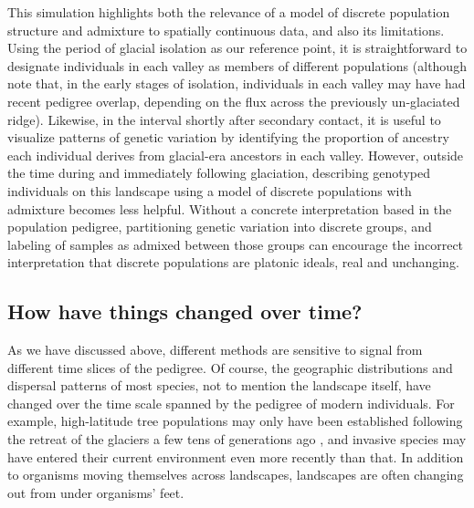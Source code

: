 \documentclass{ar-1col}
\newcommand{\g}[1]{{\color{blue}{#1}}}
\begin{document}
This simulation highlights both the relevance of 
a model of discrete population structure and admixture
to spatially continuous data, 
and also its limitations.
Using the period of glacial isolation as our reference point, 
it is straightforward to designate individuals in each valley 
as members of different populations 
(although note that, in the early stages of isolation, 
individuals in each valley may have had recent pedigree overlap, 
depending on the flux across the previously un-glaciated ridge).
Likewise, 
in the interval shortly after secondary contact, 
it is useful to visualize patterns of genetic variation 
by identifying the proportion of ancestry 
each individual derives from glacial-era ancestors in each valley.
However, 
outside the time during and immediately following glaciation, 
describing genotyped individuals on this landscape 
using a model of discrete populations with admixture 
becomes less helpful.
Without a concrete interpretation based in the population pedigree,
partitioning genetic variation into discrete groups, 
and labeling of samples as admixed between those groups
can encourage the incorrect interpretation that discrete populations are platonic ideals,
real and unchanging.

\g{estimating admixture?! could talk about the utility of chromosome painting etc.}

\subsection{How have things changed over time?}

As we have discussed above,
different methods are sensitive to signal
from different time slices of the pedigree.
Of course, the geographic distributions and dispersal patterns of most species,
not to mention the landscape itself,
have changed over the time scale spanned by the pedigree of modern individuals.
For example, 
high-latitude tree populations may only have been established
following the retreat of the glaciers
a few tens of generations ago \citep{WhitlockMcCauley1999},
and invasive species may have entered their current
environment even more recently than that.
In addition to organisms moving themselves across landscapes,
landscapes are often changing out from under organisms' feet.
\end{document}
